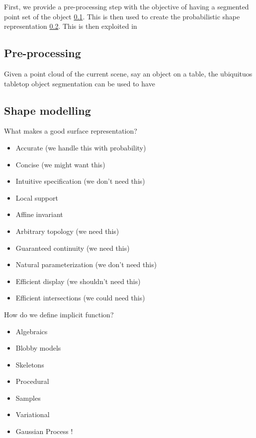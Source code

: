 First, we provide a pre-processing step with the objective of having a segmented point set of the object \ref{sec:pre}. This is then used to create the probabilistic shape representation \ref{sec:object}. This is then exploited in 

\subsection{Pre-processing}
\label{sec:pre}

Given a point cloud of the current scene, say an object on a table, the ubiquituos tabletop object segmentation 
\citep{TabletopObjectDetector} can be used to have 

\subsection{Shape modelling}
\label{sec:object}
What makes a good surface representation?
\begin{itemize}
\item Accurate (we handle this with probability)
\item Concise (we might want this)
\item Intuitive specification (we don't need this)
\item Local support
\item Affine invariant 
\item Arbitrary topology (we need this)
\item Guaranteed continuity (we need this)
\item Natural parameterization (we don't need this)
\item Efficient display (we shouldn't need this)
\item Efficient intersections (we could need this)
\end{itemize}

How do we define implicit function?
\begin{itemize}
\item Algebraics
\item Blobby models
\item Skeletons
\item Procedural
\item Samples
\item Variational
\item Gaussian Process !
\end{itemize}

